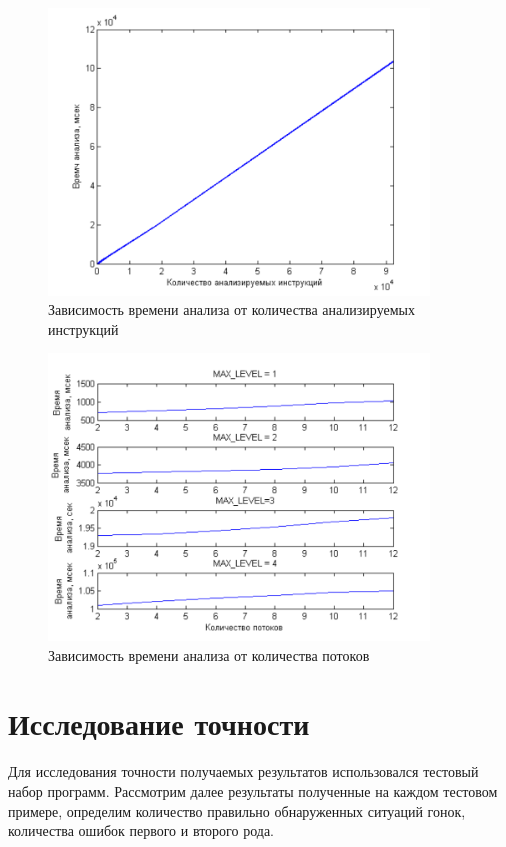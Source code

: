 \begin{figure}
  \centering
  \includegraphics[width=0.9\textwidth]{inc/png/graphic4}
  \caption{Зависимость времени анализа от количества анализируемых инструкций}
  \label{fig:graphic4}
\end{figure}

\begin{figure}
  \centering
  \includegraphics[width=0.9\textwidth]{inc/png/graphic5}
  \caption{Зависимость времени анализа от количества потоков}
  \label{fig:graphic5}
\end{figure}


\section{Исследование точности}

Для исследования точности получаемых результатов использовался тестовый набор программ. Рассмотрим далее результаты полученные на каждом тестовом примере, определим количество правильно обнаруженных ситуаций гонок, количества ошибок первого и второго рода.

